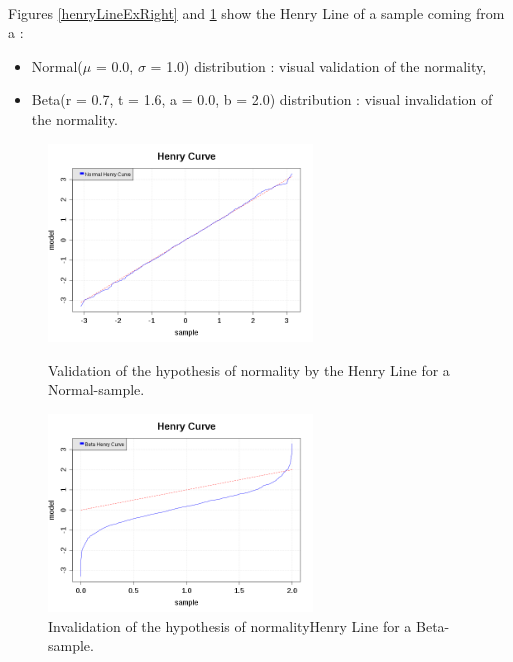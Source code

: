 \textspace\\
Figures \ref{henryLineExRight} and \ref{henryLineExFalse} show the Henry Line of a sample coming from a  :
\begin{itemize}
\item  Normal($\mu$ = 0.0, $\sigma$ = 1.0) distribution : visual validation of the normality,
\item  Beta(r = 0.7, t = 1.6, a = 0.0, b = 2.0) distribution : visual invalidation of the normality.
\end{itemize}



\begin{figure}[H]
  \begin{minipage}{10cm}
    \begin{center}
      \includegraphics[width=7cm]{HenryLineTestRight.png}
      \caption{Validation of the hypothesis of normality by the Henry Line for a Normal-sample.}
      \label{henryLineExRight}
    \end{center}
  \end{minipage}
  \hfill
  \begin{minipage}{10cm}
    \begin{center}
      \includegraphics[width=7cm]{HenryLineTestFalse.png}
      \caption{Invalidation of the hypothesis of normalityHenry Line for a Beta-sample.}
      \label{henryLineExFalse}
    \end{center}
  \end{minipage}
\end{figure}

